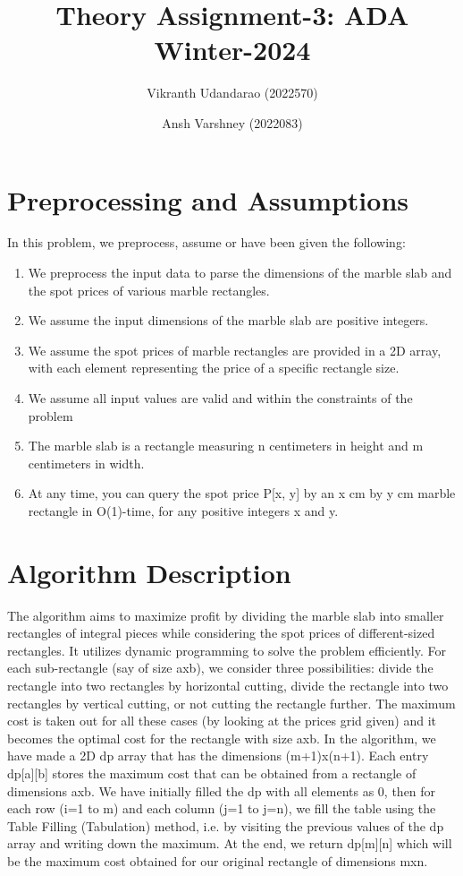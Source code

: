 \documentclass{article}
\title{Theory Assignment-3: ADA Winter-2024}
\author{Vikranth Udandarao (2022570) \and Ansh Varshney (2022083)}
\date{}
\begin{document}
\maketitle


\section{Preprocessing and Assumptions}
    In this problem, we preprocess, assume or have been given the following:

    \begin{enumerate}
        \item We preprocess the input data to parse the dimensions of the marble slab and the spot prices of various marble rectangles.
        \item We assume the input dimensions of the marble slab are positive integers.
        \item We assume the spot prices of marble rectangles are provided in a 2D array, with each element representing the price of a specific rectangle size.
        \item We assume all input values are valid and within the constraints of the problem
        \item The marble slab is a rectangle measuring n centimeters in height and m centimeters in width.
        \item At any time, you can query the spot price P[x, y] by an x cm by y cm marble rectangle in O(1)-time, for any positive integers x and y.
    
    \end{enumerate}


\section{Algorithm Description}
    The algorithm aims to maximize profit by dividing the marble slab into smaller rectangles of integral pieces while considering the spot prices of different-sized rectangles. It utilizes dynamic programming to solve the problem efficiently. For each sub-rectangle (say of size axb), we consider three possibilities: divide the rectangle into two rectangles by horizontal cutting, divide the rectangle into two rectangles by vertical cutting, or not cutting the rectangle further. The maximum cost is taken out for all these cases (by looking at the prices grid given) and it becomes the optimal cost for the rectangle with size axb. In the algorithm, we have made a 2D dp array that has the dimensions (m+1)x(n+1). Each entry dp[a][b] stores the maximum cost that can be obtained from a rectangle of dimensions axb. We have initially filled the dp with all elements as 0, then for each row (i=1 to m) and each column (j=1 to j=n), we fill the table using the Table Filling (Tabulation) method, i.e. by visiting the previous values of the dp array and writing down the maximum. At the end, we return dp[m][n] which will be the maximum cost obtained for our original rectangle of dimensions mxn.
\end{document}
